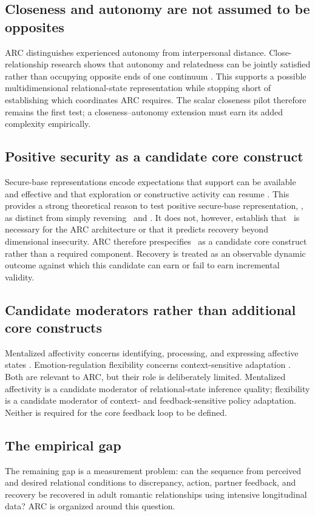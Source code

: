 \subsection{Closeness and autonomy are not assumed to be opposites}

ARC distinguishes experienced autonomy from interpersonal distance. Close-relationship research shows that autonomy and relatedness can be jointly satisfied rather than occupying opposite ends of one continuum \parencite{kluwer2020autonomy}. This supports a possible multidimensional relational-state representation while stopping short of establishing which coordinates ARC requires. The scalar closeness pilot therefore remains the first test; a closeness--autonomy extension must earn its added complexity empirically.

\subsection{Positive security as a candidate core construct}

Secure-base representations encode expectations that support can be available and effective and that exploration or constructive activity can resume \parencite{waters2006workingmodels,waters2019securebase,waters2025securebase}. This provides a strong theoretical reason to test positive secure-base representation, \Sec, as distinct from simply reversing \Anx\ and \Avo. It does not, however, establish that \Sec\ is necessary for the ARC architecture or that it predicts recovery beyond dimensional insecurity. ARC therefore prespecifies \Sec\ as a candidate core construct rather than a required component. Recovery is treated as an observable dynamic outcome against which this candidate can earn or fail to earn incremental validity.

\subsection{Candidate moderators rather than additional core constructs}

Mentalized affectivity concerns identifying, processing, and expressing affective states \parencite{greenberg2017mentalized}. Emotion-regulation flexibility concerns context-sensitive adaptation \parencite{mosannenzadeh2024flexibility}. Both are relevant to ARC, but their role is deliberately limited. Mentalized affectivity is a candidate moderator of relational-state inference quality; flexibility is a candidate moderator of context- and feedback-sensitive policy adaptation. Neither is required for the core feedback loop to be defined.

\subsection{The empirical gap}

The remaining gap is a measurement problem: can the sequence from perceived and desired relational conditions to discrepancy, action, partner feedback, and recovery be recovered in adult romantic relationships using intensive longitudinal data? ARC is organized around this question.
